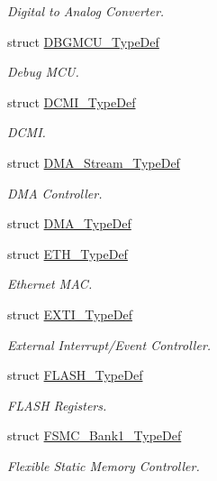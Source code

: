 \begin{DoxyCompactItemize}
\begin{DoxyCompactList}\small\item\em Digital to Analog Converter. \end{DoxyCompactList}\item 
struct \hyperlink{struct_d_b_g_m_c_u___type_def}{D\+B\+G\+M\+C\+U\+\_\+\+Type\+Def}
\begin{DoxyCompactList}\small\item\em Debug M\+CU. \end{DoxyCompactList}\item 
struct \hyperlink{struct_d_c_m_i___type_def}{D\+C\+M\+I\+\_\+\+Type\+Def}
\begin{DoxyCompactList}\small\item\em D\+C\+MI. \end{DoxyCompactList}\item 
struct \hyperlink{struct_d_m_a___stream___type_def}{D\+M\+A\+\_\+\+Stream\+\_\+\+Type\+Def}
\begin{DoxyCompactList}\small\item\em D\+MA Controller. \end{DoxyCompactList}\item 
struct \hyperlink{struct_d_m_a___type_def}{D\+M\+A\+\_\+\+Type\+Def}
\item 
struct \hyperlink{struct_e_t_h___type_def}{E\+T\+H\+\_\+\+Type\+Def}
\begin{DoxyCompactList}\small\item\em Ethernet M\+AC. \end{DoxyCompactList}\item 
struct \hyperlink{struct_e_x_t_i___type_def}{E\+X\+T\+I\+\_\+\+Type\+Def}
\begin{DoxyCompactList}\small\item\em External Interrupt/\+Event Controller. \end{DoxyCompactList}\item 
struct \hyperlink{struct_f_l_a_s_h___type_def}{F\+L\+A\+S\+H\+\_\+\+Type\+Def}
\begin{DoxyCompactList}\small\item\em F\+L\+A\+SH Registers. \end{DoxyCompactList}\item 
struct \hyperlink{struct_f_s_m_c___bank1___type_def}{F\+S\+M\+C\+\_\+\+Bank1\+\_\+\+Type\+Def}
\begin{DoxyCompactList}\small\item\em Flexible Static Memory Controller. \end{DoxyCompactList}\item 

\end{DoxyCompactItemize}
